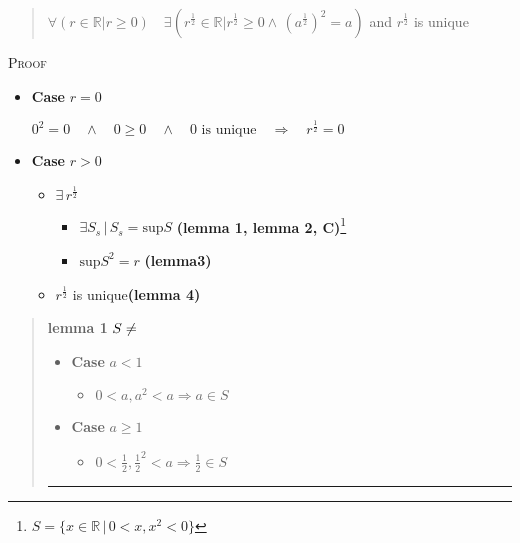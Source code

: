 \documentclass{tufte-book}
\providecommand{\tightlist}{%
  \setlength{\itemsep}{0pt}\setlength{\parskip}{0pt}}
\begin{document}
\begin{quote}
\(\forall (r \in \mathbb{R} | r \geq 0 ) \quad \exists \left( r^{\frac{1}{2}} \in \mathbb{R} | r^{\frac{1}{2}} \geq 0 \wedge\, \left(a^{\frac{1}{2}} \right)^2 = a \right)\)
and \(r^{\frac{1}{2}}\) is unique
\end{quote}

\textsc{Proof}

\begin{itemize}
\item
  \textbf{Case} \(r = 0\)

  \(0^2 = 0 \quad \wedge \quad 0 \geq 0 \quad \wedge \quad 0 \text{ is unique} \quad \Rightarrow \quad r^{\frac{1}{2}} = 0\)
\item
  \textbf{Case} \(r > 0\)

  \begin{itemize}
  \tightlist
  \item
    \(\exists\, r^{\frac{1}{2}}\)

    \begin{itemize}
    \tightlist
    \item
      \(\exists S_s \, | \, S_s = \text{sup} S\) \textbf{(lemma 1, lemma
      2, C)}\footnote{\(S = \{ x \in \mathbb{R} \, | \, 0 <x, x^2 < 0 \}\)}
    \item
      \(\text{sup}S^2 = r\) \textbf{(lemma3)}
    \end{itemize}
  \item
    \(r^{\frac{1}{2}}\) is unique\textbf{(lemma 4)}
  \end{itemize}
\end{itemize}

\begin{quote}
\textbf{lemma 1} \(S \neq \empty\)

\begin{itemize}
\tightlist
\item
  \textbf{Case} \(a < 1\)

  \begin{itemize}
  \tightlist
  \item
    \(0 < a , a^2 < a \Rightarrow a \in S\)\\
  \end{itemize}
\item
  \textbf{Case} \(a \geq 1\)

  \begin{itemize}
  \tightlist
  \item
    \(0 < \frac{1}{2}, \frac{1}{2}^2 < a \Rightarrow \frac{1}{2} \in S\)
  \end{itemize}
\end{itemize}

\begin{center}\rule{0.5\linewidth}{\linethickness}\end{center}
\end{quote}
\end{document}

